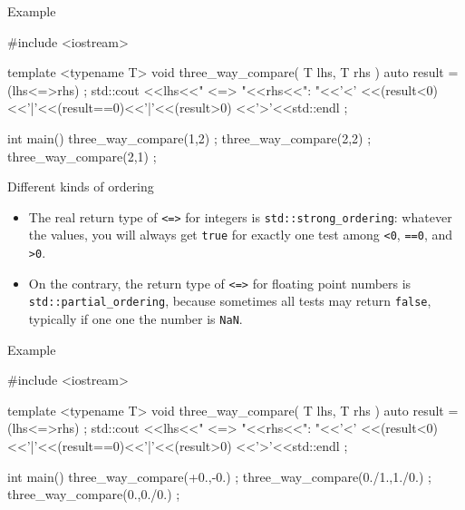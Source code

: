 \begin{frame}[fragile]
  \begin{exampleblock}{Example}
    \scriptsize
    \begin{cppcode*}{}
    #include <iostream>

    template <typename T>
    void three_way_compare( T lhs, T rhs )
     {
      auto result = (lhs<=>rhs) ;
      std::cout
        <<lhs<<" <=> "<<rhs<<": "<<'<'
        <<(result<0)<<'|'<<(result==0)<<'|'<<(result>0)
        <<'>'<<std::endl ;
     }

    int main()
     {
      three_way_compare(1,2) ;
      three_way_compare(2,2) ;
      three_way_compare(2,1) ;
     }
    \end{cppcode*}
  \end{exampleblock}
\end{frame}

\begin{frame}[fragile]
  \begin{block}{Different kinds of ordering}
    \begin{itemize}
    \item The real return type of \texttt{<=>} for integers is \texttt{std::strong_ordering}: whatever the values, you will always get \texttt{true} for exactly one test among \texttt{<0}, \texttt{==0}, and \texttt{>0}.
    \item On the contrary, the return type of \texttt{<=>} for floating point numbers is \texttt{std::partial_ordering}, because sometimes all tests may return \texttt{false}, typically if one one the number is \texttt{NaN}.
    \end{itemize}
  \end{block}
  \begin{exampleblock}{Example}
    \scriptsize
    \begin{cppcode*}{}
    #include <iostream>

    template <typename T>
    void three_way_compare( T lhs, T rhs )
     {
      auto result = (lhs<=>rhs) ;
      std::cout
        <<lhs<<" <=> "<<rhs<<": "<<'<'
        <<(result<0)<<'|'<<(result==0)<<'|'<<(result>0)
        <<'>'<<std::endl ;
     }

    int main()
     {
      three_way_compare(+0.,-0.) ;
      three_way_compare(0./1.,1./0.) ;
      three_way_compare(0.,0./0.) ;
     }
    \end{cppcode*}
  \end{exampleblock}
\end{frame}

